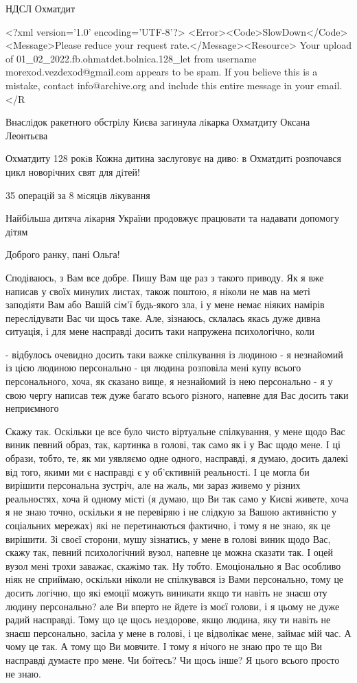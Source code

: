 НДСЛ Охматдит


<?xml version='1.0' encoding='UTF-8'?>
<Error><Code>SlowDown</Code><Message>Please reduce your request rate.</Message><Resource>
Your upload of 01_02_2022.fb.ohmatdet.bolnica.128_let from username morexod.vezdexod@gmail.com appears to be spam. If you believe this is a mistake, 
contact info@archive.org and include this entire message in your email.</R

Внаслiдок ракетного обстрiлу Києва загинула лiкарка Охматдиту Оксана Леонтьєва

Охматдиту 128 рокiв
Кожна дитина заслуговує на диво: в Охматдитi розпочався цикл новорiчних свят для дiтей!

35 операцiй за 8 мiсяцiв лiкування

Найбiльша дитяча лiкарня України продовжує працювати та надавати допомогу дiтям


Доброго ранку, пані Ольга!

Сподіваюсь, з Вам все добре. Пишу Вам ще раз з такого приводу.
Як я вже написав у своїх минулих листах, також поштою, я ніколи не мав
на меті заподіяти Вам або Вашій сім'ї будь-якого зла, і у мене
немає ніяких намірів переслідувати Вас чи щось таке. Але, зізнаюсь,
склалась якась дуже дивна ситуація, і для мене насправді досить таки
напружена психологічно, коли

- відбулось очевидно досить таки важке спілкування із людиною
- я незнайомий із цією людиною персонально
- ця людина розповіла мені купу всього персонального, хоча, як сказано вище,
я незнайомий із нею персонально
- я у свою чергу написав теж дуже багато всього різного, напевне для Вас досить таки
неприємного

Скажу так. Оскільки це все було чисто віртуальне спілкування, у мене щодо Вас
виник певний образ, так, картинка в голові, так само як і у Вас щодо мене. І ці образи, тобто, те, як ми уявляємо 
одне одного, насправді, я думаю, досить далекі від того, якими ми є насправді є 
у об'єктивній реальності. І це могла би вирішити персональна зустріч, але на жаль,
ми зараз живемо у різних реальностях, хоча й одному місті (я думаю, що Ви так само у Києві живете, хоча я не знаю точно, оскільки 
я не перевіряю і не слідкую за Вашою активністю у соціальних мережах) які не перетинаються фактично, і тому я не знаю,
як це вирішити. Зі своєї сторони, мушу зізнатись, у мене в голові виник щодо Вас, скажу так,
певний психологічний вузол, напевне це можна сказати так. І оцей вузол мені трохи заважає, скажімо так.
Ну тобто. Емоціонально я Вас особливо ніяк не сприймаю,
оскільки ніколи не спілкувався із Вами персонально, тому це досить логічно, що які емоції можуть виникати
якщо ти навіть не знаєш оту людину персонально?
але Ви вперто не йдете із моєї голови, і я цьому не дуже радий насправді. 
Тому що це щось нездорове, якщо людина, яку ти навіть не знаєш персонально, засіла у мене в голові, і це відволікає мене, займає мій час.
А чому це так. А тому що Ви мовчите. І тому я нічого не знаю про те що Ви насправді думаєте про мене.
Чи боїтесь? Чи щось інше? Я цього всього просто не знаю. 

